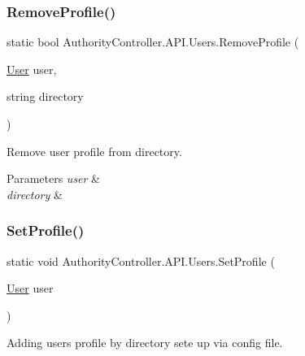 \subsubsection{\texorpdfstring{Remove\+Profile()}{RemoveProfile()}\hspace{0.1cm}{\footnotesize\ttfamily [2/2]}}
{\footnotesize\ttfamily static bool Authority\+Controller.\+A\+P\+I.\+Users.\+Remove\+Profile (\begin{DoxyParamCaption}\item[{\mbox{\hyperlink{class_authority_controller_1_1_data_1_1_personal_1_1_user}{User}}}]{user,  }\item[{string}]{directory }\end{DoxyParamCaption})\hspace{0.3cm}{\ttfamily [static]}}



Remove user profile from directory. 


\begin{DoxyParams}{Parameters}
{\em user} & \\
\hline
{\em directory} & \\
\hline
\end{DoxyParams}
\mbox{\label{class_authority_controller_1_1_a_p_i_1_1_users_a5d8242dfe20d058ea78d9f50b3b3c3cd}} 
\subsubsection{\texorpdfstring{Set\+Profile()}{SetProfile()}\hspace{0.1cm}{\footnotesize\ttfamily [1/2]}}
{\footnotesize\ttfamily static void Authority\+Controller.\+A\+P\+I.\+Users.\+Set\+Profile (\begin{DoxyParamCaption}\item[{\mbox{\hyperlink{class_authority_controller_1_1_data_1_1_personal_1_1_user}{User}}}]{user }\end{DoxyParamCaption})\hspace{0.3cm}{\ttfamily [static]}}



Adding user\textquotesingle{}s profile by directory sete up via config file. 


